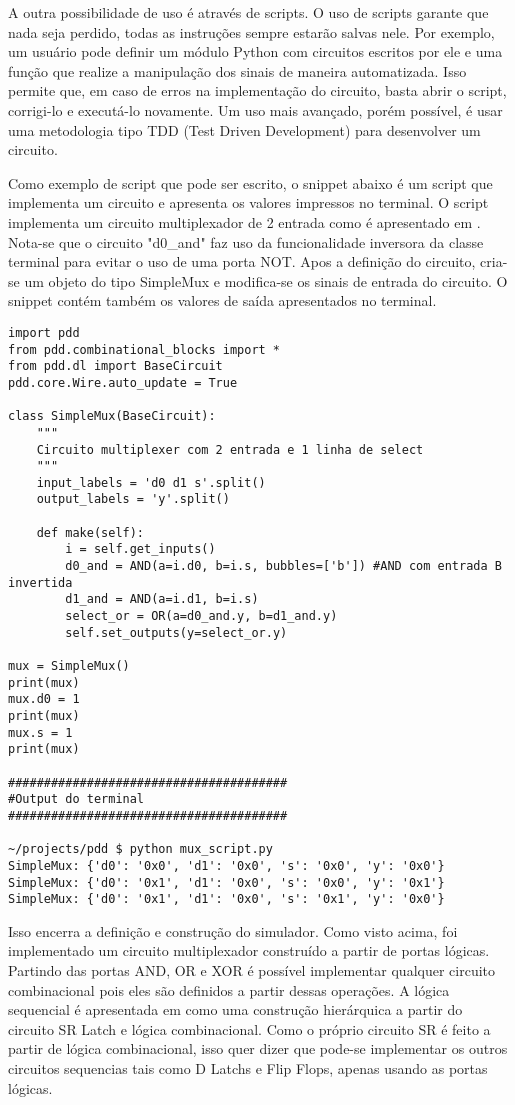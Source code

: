 A outra possibilidade de uso é através de scripts.
O uso de scripts garante que nada seja perdido, todas as instruções sempre estarão salvas nele.
Por exemplo, um usuário pode definir um módulo Python com circuitos escritos por ele e uma função que realize a manipulação dos sinais de maneira automatizada.
Isso permite que, em caso de erros na implementação do circuito, basta abrir o script, corrigi-lo e executá-lo novamente.
Um uso mais avançado, porém possível, é usar uma metodologia tipo TDD (Test Driven Development) para desenvolver um circuito.

Como exemplo de script que pode ser escrito, o snippet abaixo é um script que implementa um circuito e apresenta os valores impressos no terminal.
O script implementa um circuito multiplexador de 2 entrada como é apresentado em \cite{harris}.
Nota-se que o circuito "d0\_and" faz uso da funcionalidade inversora da classe terminal para evitar o uso de uma porta NOT.
Apos a definição do circuito, cria-se um objeto do tipo SimpleMux e modifica-se os sinais de entrada do circuito.
O snippet contém também os valores de saída apresentados no terminal.

\begin{lstlisting}
import pdd
from pdd.combinational_blocks import *
from pdd.dl import BaseCircuit
pdd.core.Wire.auto_update = True

class SimpleMux(BaseCircuit):
    """
    Circuito multiplexer com 2 entrada e 1 linha de select
    """
    input_labels = 'd0 d1 s'.split()
    output_labels = 'y'.split()

    def make(self):
        i = self.get_inputs()
        d0_and = AND(a=i.d0, b=i.s, bubbles=['b']) #AND com entrada B invertida
        d1_and = AND(a=i.d1, b=i.s)
        select_or = OR(a=d0_and.y, b=d1_and.y)
        self.set_outputs(y=select_or.y)

mux = SimpleMux()
print(mux)
mux.d0 = 1
print(mux)
mux.s = 1
print(mux)

#######################################
#Output do terminal
#######################################

~/projects/pdd $ python mux_script.py
SimpleMux: {'d0': '0x0', 'd1': '0x0', 's': '0x0', 'y': '0x0'}
SimpleMux: {'d0': '0x1', 'd1': '0x0', 's': '0x0', 'y': '0x1'}
SimpleMux: {'d0': '0x1', 'd1': '0x0', 's': '0x1', 'y': '0x0'}
\end{lstlisting}

Isso encerra a definição e construção do simulador.
Como visto acima, foi implementado um circuito multiplexador construído a partir de portas lógicas.
Partindo das portas AND, OR e XOR é possível implementar qualquer circuito combinacional pois eles são definidos a partir dessas operações.
A lógica sequencial é apresentada em \cite{harris} como uma construção hierárquica a partir do circuito SR Latch e lógica combinacional.
Como o próprio circuito SR é feito a partir de lógica combinacional, isso quer dizer que pode-se implementar os outros circuitos sequencias tais como D Latchs e Flip Flops, apenas usando as portas lógicas.

